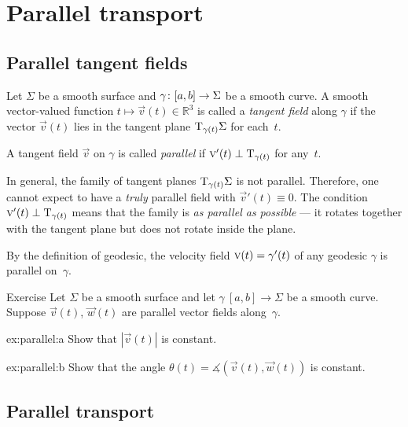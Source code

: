 \chapter{Parallel transport}
\label{chap:parallel-transport}

\section{Parallel tangent fields}

Let $\Sigma$ be a smooth surface and $\gamma\:[a,b]\z\to \Sigma$ be a smooth curve.
A smooth vector-valued function $t\mapsto {\vec v}(t) \in \mathbb{R}^3$ is called a \emph{tangent field} along $\gamma$ if
the vector ${\vec v}(t)$ lies in the tangent plane $\mathrm{T}_{\gamma(t)}\Sigma$ for each~$t$.

A tangent field $\vec v$ on $\gamma$ is called \emph{parallel} if ${\text{\sc{v}}}'(t)\perp\mathrm{T}_{\gamma(t)}$ for any~$t$.

In general, the family of tangent planes $\mathrm{T}_{\gamma(t)}\Sigma$ is not parallel.
Therefore, one cannot expect to have a \textit{truly} parallel field with ${\vec v}'(t)\equiv 0$.
The condition ${\text{\sc{v}}}'(t)\perp\mathrm{T}_{\gamma(t)}$ means that the family is \textit{as parallel as possible} --- it rotates together with the tangent plane but does not rotate inside the plane.

By the definition of geodesic, the velocity field ${\vec v}(t)\z=\gamma'(t)$ of any geodesic $\gamma$ is parallel on~$\gamma$.

\begin{thm}{Exercise}\label{ex:parallel}
Let $\Sigma$ be a smooth surface and let 
$\gamma\:[a,b]\to \Sigma$ be a smooth curve.
Suppose ${\vec v}(t)$, $\vec w(t)$ are parallel vector fields along~$\gamma$.

\begin{subthm}{ex:parallel:a} Show that $|{\vec v}(t)|$ is constant.
\end{subthm}

\begin{subthm}{ex:parallel:b} Show that the angle $\theta(t)=\measuredangle({\vec v}(t),\vec w(t))$ is constant.
\end{subthm}

\end{thm}

\section{Parallel transport}

